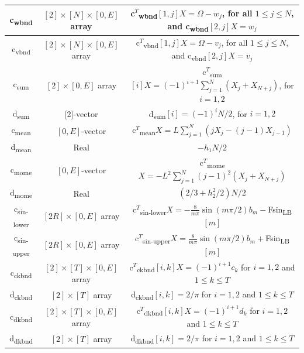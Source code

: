 \documentclass[12pt]{article}
\numberwithin{equation}{section}
\begin{document}
\begin{table}[!h]
\begin{tabular}{| c |c |c|}
 \hline
   c\textsubscript{wbnd}& $[2] \times [N] \times [0,E]$ array &   \makecell{  c$^T$\textsubscript{wbnd}$[1,j]X = \Omega-w_j$, for all $1 \leq j \leq N$, and \\  c\textsubscript{wbnd}$[2,j]X = w_j$} \\ 
 \hline
    c\textsubscript{vbnd}& $[2] \times [N] \times [0,E]$ array &   \makecell{  c$^T$\textsubscript{vbnd}$[1,j]X = \Omega-v_j$, for all $1 \leq j \leq N$, and \\  c\textsubscript{vbnd}$[2,j]X = v_j$} \\ 
 \hline
   c\textsubscript{sum}& $[2]\times [0,E]$ array  &  c$^T$\textsubscript{sum}$[i]X = (-1)^{i+1} \sum_{j=1}^N (X_j + X_{N+j})$, for $i = 1,2$\\ 
 \hline
   d\textsubscript{sum}& [2]-vector  & d\textsubscript{sum}$[i] = (-1)^iN/2$, for $i=1,2$ \\ 
 \hline
    c\textsubscript{mean}& $[0,E]$-vector  &  c$^T$\textsubscript{mean}$X = L\sum_{j=1}^N(jX_j - (j-1)X_{j-1})$ \\ 
 \hline
   d\textsubscript{mean}& Real  & $-h_1N/2$ \\ 
 \hline
     c\textsubscript{mome}& $[0,E]$-vector  &  c$^T$\textsubscript{mome}$X = -L^2\sum_{j=1}^N (j-1)^2(X_j+X_{N+j})$  \\ 
 \hline
   d\textsubscript{mome}& Real  & $(2/3 + h_2^2/2)N/2$ \\ 
 \hline
      c\textsubscript{sin-lower}& $ [2R] \times [0,E]$ array  & c$^T$\textsubscript{sin-lower}$X =-\frac{8}{m \pi}\sin\left( m\pi /2 \right) b_m -$Fsin\textsubscript{LB}$[m]$   \\ 
 \hline
   c\textsubscript{sin-upper}& $ [2R] \times [0,E]$ array   & c$^T$\textsubscript{sin-upper}$X =\frac{8}{m \pi}\sin\left( m\pi /2 \right) b_m+$Fsin\textsubscript{LB}$[m]$ \\ 
 \hline
      c\textsubscript{ckbnd}& $[2] \times [T] \times [0,E]$ array  &  c$^T$\textsubscript{ckbnd}$[i,k]X = (-1)^{i+1} c_k$ for $i=1,2$ and $1 \leq k \leq T$ \\ 
 \hline
   d\textsubscript{ckbnd}& $[2] \times [T] $ array  & d\textsubscript{ckbnd}$[i,k] = 2/\pi$ for $i = 1,2$ and $1 \leq k \leq T$ \\ 
 \hline
       c\textsubscript{dkbnd}& $[2] \times [T] \times [0,E]$ array  &  c$^T$\textsubscript{dkbnd}$[i,k]X = (-1)^{i+1} d_k$  for $i=1,2$ and $1 \leq k \leq T$ \\ 
 \hline
   d\textsubscript{dkbnd}& $[2] \times [T] $ array  &  d\textsubscript{dkbnd}$[i,k] = 2/\pi$ for $i = 1,2$ and $1 \leq k \leq T$ \\ 

\end{tabular}
\end{table}
\end{document}
